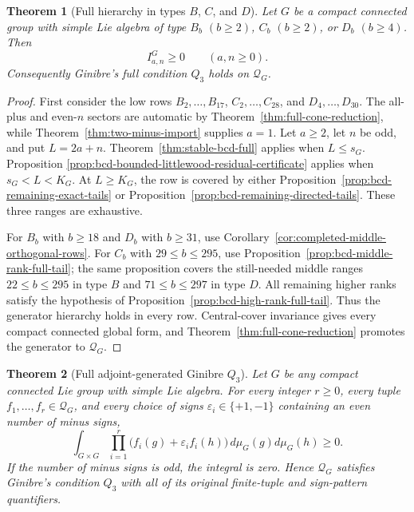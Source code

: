 \documentclass[11pt,reqno]{amsart}
\theoremstyle{plain}
\newtheorem{theorem}{Theorem}[section]
\theoremstyle{definition}
\newcommand{\Qcone}{\mathcal Q}
\begin{document}
\begin{theorem}[Full hierarchy in types $B$, $C$, and $D$]
\label{thm:bcd-full-hierarchy}
Let $G$ be a compact connected group with simple Lie algebra of type
$B_b$ $(b\geq2)$, $C_b$ $(b\geq2)$, or $D_b$ $(b\geq4)$.  Then
\[
 I^G_{a,n}\geq0\qquad(a,n\geq0).
\]
Consequently Ginibre's full condition $Q_3$ holds on $\Qcone_G$.
\end{theorem}

\begin{proof}
First consider the low rows $B_2,\ldots,B_{17}$,
$C_2,\ldots,C_{28}$, and $D_4,\ldots,D_{30}$.  The all-plus and even-$n$
sectors are automatic by Theorem~\ref{thm:full-cone-reduction}, while
Theorem~\ref{thm:two-minus-import} supplies $a=1$.  Let $a\geq2$, let $n$
be odd, and put $L=2a+n$.  Theorem~\ref{thm:stable-bcd-full} applies when
$L\leq s_G$.  Proposition
\ref{prop:bcd-bounded-littlewood-residual-certificate} applies when
$s_G<L<K_G$.  At $L\geq K_G$, the row is covered by either
Proposition~\ref{prop:bcd-remaining-exact-tails} or
Proposition~\ref{prop:bcd-remaining-directed-tails}.  These three ranges are
exhaustive.

For $B_b$ with $b\geq18$ and $D_b$ with $b\geq31$, use
Corollary~\ref{cor:completed-middle-orthogonal-rows}.  For $C_b$ with
$29\leq b\leq295$, use
Proposition~\ref{prop:bcd-middle-rank-full-tail}; the same proposition covers
the still-needed middle ranges $22\leq b\leq295$ in type $B$ and
$71\leq b\leq297$ in type $D$.  All remaining higher ranks satisfy the
hypothesis of Proposition~\ref{prop:bcd-high-rank-full-tail}.  Thus the
generator hierarchy holds in every row.  Central-cover invariance gives every
compact connected global form, and
Theorem~\ref{thm:full-cone-reduction} promotes the generator to $\Qcone_G$.
\end{proof}

\begin{theorem}[Full adjoint-generated Ginibre $Q_3$]
\label{thm:full-adjoint-generated-q3}
Let $G$ be any compact connected Lie group with simple Lie algebra.  For every
integer $r\geq0$, every tuple $f_1,\ldots,f_r\in\Qcone_G$, and every choice
of signs $\varepsilon_i\in\{+1,-1\}$ containing an even number of minus
signs,
\[
 \int_{G\times G}\prod_{i=1}^{r}
 \bigl(f_i(g)+\varepsilon_i f_i(h)\bigr)
 \,d\mu_G(g)d\mu_G(h)\geq0.
\]
If the number of minus signs is odd, the integral is zero.  Hence
$\Qcone_G$ satisfies Ginibre's condition $Q_3$ with all of its original
finite-tuple and sign-pattern quantifiers.
\end{theorem}
\end{document}
